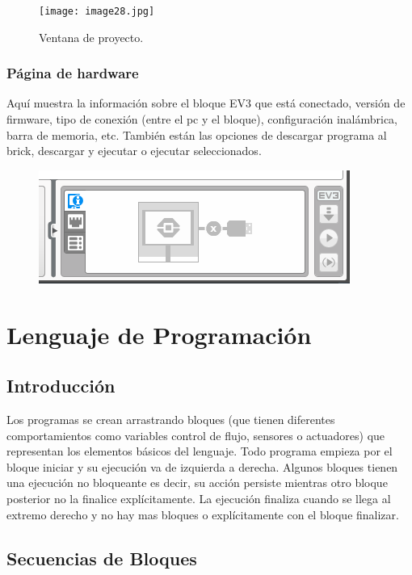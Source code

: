 \documentclass[12pt,a4paper]{article}
\begin{document}
\begin{figure}
	\caption{Ventana de proyecto.\label{fig:proyecto}}
	\texttt{[image: image28.jpg]}
	\centering
\end{figure}

\subsubsection{Página de hardware}
Aquí muestra la información sobre el bloque EV3 que está conectado, versión de
firmware, tipo de conexión (entre el pc y el bloque), configuración inalámbrica,
barra de memoria, etc. También están las opciones de descargar programa al
brick, descargar y ejecutar o ejecutar seleccionados.

\begin{figure}[H]
	\includegraphics{controEV3.PNG}
	\centering
\end{figure}


\section{Lenguaje de Programación}

\subsection{Introducción}

Los programas se crean arrastrando bloques (que tienen diferentes comportamientos
como variables control de flujo, sensores o actuadores) que representan los
elementos básicos del lenguaje. Todo programa empieza por el bloque iniciar y su
ejecución va de izquierda a derecha. Algunos bloques tienen una ejecución no
bloqueante es decir, su acción persiste mientras otro bloque posterior no la
finalice explícitamente. La ejecución finaliza cuando se llega al extremo derecho
y no hay mas bloques o explícitamente con el bloque finalizar.

\subsection{Secuencias de Bloques}
\end{document}
